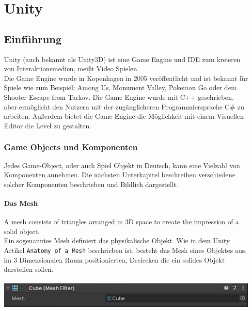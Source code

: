 \pagebreak
{}
\chapter{Unity}

\section{Einführung}
Unity (auch bekannt als Unity3D) ist eine Game Engine und IDE zum kreieren von Interaktionsmedien, meißt Video Spielen. \Cite[][A history of the unity game engine]{haas2014history} \\ %

Die Game Engine wurde in Kopenhagen in 2005 veröffentlicht und ist bekannt für Spiele wie zum Beispiel: Among Us, Monument Valley, Pokemon Go oder dem Shooter Escape from Tarkov. Die Game Engine wurde mit C++ geschrieben, aber ermöglicht den Nutzern mit der zugänglicheren Programmiersprache C\# zu arbeiten. Außerdem bietet die Game Engine die Möglichkeit mit einem Visuellen Editor die Level zu gestalten.

\subsection{Game Objects und Komponenten}
Jedes Game-Object, oder auch Spiel Objekt in Deutsch, kann eine Vielzahl von Komponenten annehmen. Die nächsten Unterkapitel beschreiben verschiedene solcher Komponenten beschrieben und Bildlich dargestellt.

\subsubsection{Das Mesh}
\glqq A mesh consists of triangles arranged in 3D space to create the impression of a solid object. \grqq \Cite[][Anatomy of a Mesh, Unity Documentation]{unitydoc}\\
Ein sogenanntes Mesh definiert das physikalische Objekt. Wie in dem Unity Artikel \verb+Anatomy of a Mesh+ beschrieben ist, besteht das Mesh eines Objektes aus, im 3 Dimensionalen Raum positionierten, Dreiecken die ein solides Objekt darstellen sollen.\\\\
\noindent
\includegraphics[width=1\linewidth]{chapters/14/Images/Mesh2.png}

